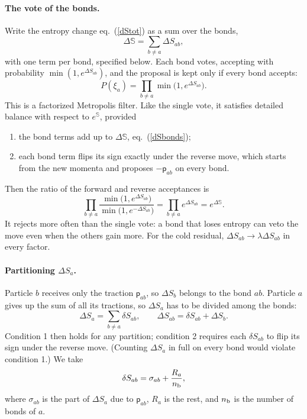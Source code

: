 \documentclass[11pt,aps,preprint,nofootinbib,superscriptaddress,tightenlines]{revtex4-2}
\def\st{\begin{equation}}
\def\stp{\end{equation}}
\def\Eq#1{eq.~(\ref{#1})}
\newcommand{\pf}{\bm{\mathsf p}}
\let\oldparagraph\paragraph
\renewcommand{\paragraph}{\par\bigskip\oldparagraph}
\begin{document}
\paragraph{The vote of the bonds.}  Write the entropy change \Eq{dStot} as a sum over the bonds,
\st
\Delta\mathbb S=\sum_{b\neq a}\Delta S_{ab} ,
\label{dSbonds}
\stp
with one term per bond, specified below.  Each bond votes, accepting with probability
$\min(1,e^{\Delta S_{ab}})$, and the proposal is kept only if every bond accepts:
\st
P(\xi_a)=\prod_{b\neq a}\min\big(1,e^{\Delta S_{ab}}\big).
\label{Pfact}
\stp
This is a factorized Metropolis filter.  Like the single vote, it satisfies detailed balance with
respect to $e^{\mathbb S}$, provided
\begin{enumerate}
\item the bond terms add up to $\Delta\mathbb S$, \Eq{dSbonds};
\item each bond term flips its sign exactly under the reverse move, which
  starts from the new momenta and proposes $-\pf_{ab}$ on every bond.
\end{enumerate}
Then the ratio of the forward and reverse acceptances is
\st
\prod_{b\neq a}\frac{\min\big(1,e^{\Delta S_{ab}}\big)}{\min\big(1,e^{-\Delta S_{ab}}\big)}
=\prod_{b\neq a}e^{\Delta S_{ab}}=e^{\Delta\mathbb S} .
\stp
It rejects more often than the single vote: a bond that loses entropy can
veto the move even when the others gain more.  For the cold residual,
$\Delta S_{ab}\to\lambda\Delta S_{ab}$ in every factor.

\paragraph{Partitioning $\Delta S_a$.}  Particle $b$ receives only the traction
$\pf_{ab}$, so $\Delta S_b$ belongs to the bond $ab$.  Particle $a$ gives up the sum
of all its tractions, so $\Delta S_a$ has to be divided among the bonds:
\st
\Delta S_a=\sum_{b\neq a}\delta S_{ab},\qquad
\Delta S_{ab}=\delta S_{ab}+\Delta S_b .
\label{dSab}
\stp
Condition 1 then holds for any partition; condition 2 requires each
$\delta S_{ab}$ to flip its sign under the reverse move.  (Counting $\Delta S_a$ in
full on every bond would violate condition 1.)  We take
\st
\delta S_{ab}=\sigma_{ab}+\frac{R_a}{n_{\rm b}} ,
\stp
where $\sigma_{ab}$ is the part of $\Delta S_a$ due to $\pf_{ab}$, $R_a$ is the rest, and
$n_{\rm b}$ is the number of bonds of $a$.
\end{document}
